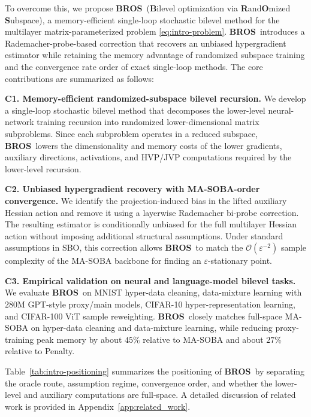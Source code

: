 \documentclass{pkumelon}
\theoremstyle{plain}
\newcommand{\oursname}{\textnormal{\textbf{BROS}}}
\newcommand{\ours}{\oursname\ }
\begin{document}
To overcome this, we propose \ours (\textbf{B}ilevel optimization via \textbf{R}and\textbf{O}mized \textbf{S}ubspace), a memory-efficient single-loop stochastic bilevel method for the multilayer matrix-parameterized problem \eqref{eq:intro-problem}. \ours introduces a Rademacher-probe-based correction that recovers an unbiased hypergradient estimator while retaining the memory advantage of randomized subspace training and the convergence rate order of exact single-loop methods. The core contributions are summarized as follows:

\textbf{C1. Memory-efficient randomized-subspace bilevel recursion.} We develop a single-loop stochastic bilevel method that decomposes the lower-level neural-network training recursion into randomized lower-dimensional matrix subproblems. Since each subproblem operates in a reduced subspace, \ours lowers the dimensionality and memory costs of the lower gradients, auxiliary directions, activations, and HVP/JVP computations required by the lower-level recursion.

\textbf{C2. Unbiased hypergradient recovery with MA-SOBA-order convergence.} We identify the projection-induced bias in the lifted auxiliary Hessian action and remove it using a layerwise Rademacher bi-probe correction. The resulting estimator is conditionally unbiased for the full multilayer Hessian action without imposing additional structural assumptions. Under standard assumptions in SBO, this correction allows \ours to match the $\mathcal O(\varepsilon^{-2})$ sample complexity of the MA-SOBA backbone for finding an $\varepsilon$-stationary point.

\textbf{C3. Empirical validation on neural and language-model bilevel tasks.} We evaluate \ours on MNIST hyper-data cleaning, data-mixture learning with $280$M GPT-style proxy/main models, CIFAR-10 hyper-representation learning, and CIFAR-100 ViT sample reweighting. \ours closely matches full-space MA-SOBA on hyper-data cleaning and data-mixture learning, while reducing proxy-training peak memory by about $45\%$ relative to MA-SOBA and about $27\%$ relative to Penalty.

Table~\ref{tab:intro-positioning} summarizes the positioning of \ours by separating the oracle route, assumption regime, convergence order, and whether the lower-level and auxiliary computations are full-space. A detailed discussion of related work is provided in Appendix~\ref{app:related_work}.
\end{document}
